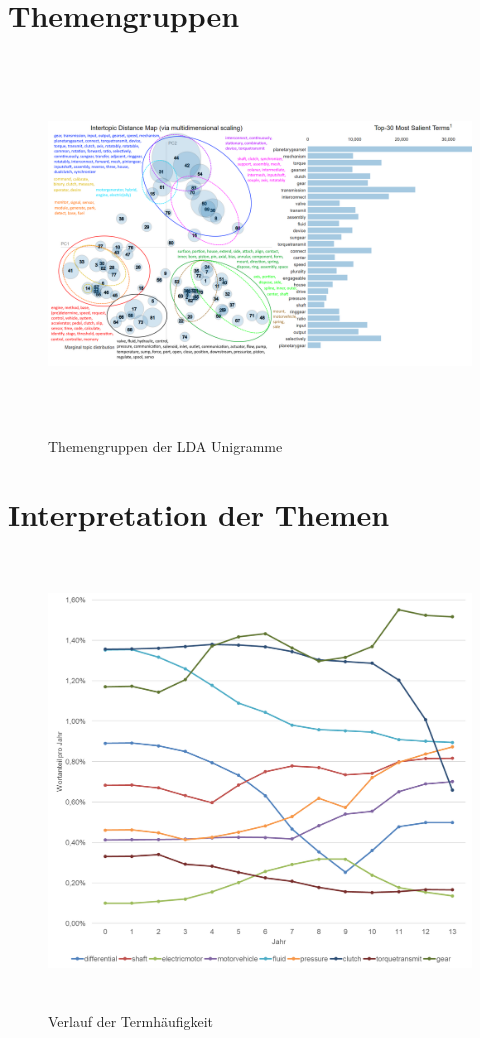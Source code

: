 \section{Themengruppen}


\begin{figure}[htpb]
	\centering
	\includegraphics[width=\textwidth,height=10cm,keepaspectratio=true]{img/LDAvisGM-3-1-1clustered.png}
	\caption{
		Themengruppen der LDA Unigramme
	}
	\label{fig:Themengruppen_LDA_Unigramm}
\end{figure}


\section{Interpretation der Themen}

\begin{figure}[htpb]
	\centering
	\includegraphics[width=\textwidth,height=12cm,keepaspectratio=true]{img/DLDA_unigram_01.png}
	\caption{
		Verlauf der Termhäufigkeit
	}
	\label{fig:DLDA_Unigramme_01}
\end{figure}